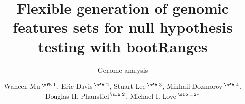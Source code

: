 \documentclass{bioinfo}
\begin{document}

\subtitle{Genome analysis}

\title[short Title]{Flexible generation of genomic features sets for null hypothesis testing with bootRanges}
\author[Sample \textit{et~al}.]{Wancen Mu\,$^{\text{\sfb 1}}$, Eric Davis\,$^{\text{\sfb 2}}$, Stuart Lee\,$^{\text{\sfb 3}}$, Mikhail Dozmorov\,$^{\text{\sfb 4}}$, Douglas H. Phanstiel\,$^{\text{\sfb 2}}$, Michael I. Love\,$^{\text{\sfb 1,2}*}$}
\address{$^{\text{\sf 1}}$Department of Biostatistics, and $^{\text{\sf 2}}$ Department of Genetics, University of North Carolina-Chapel Hill, NC 27599
$^{\text{\sf 3}}$Department of Econometrics and Business Statistics, Monash University, Clayton, Australia $^{\text{\sf 4}}$Department of Biostatistics, Department of Pathology, Virginia Commonwealth University, Richmond, VA 23298.\\}





\maketitle
{}





%
%
%
%
%
%
%

\end{document}
